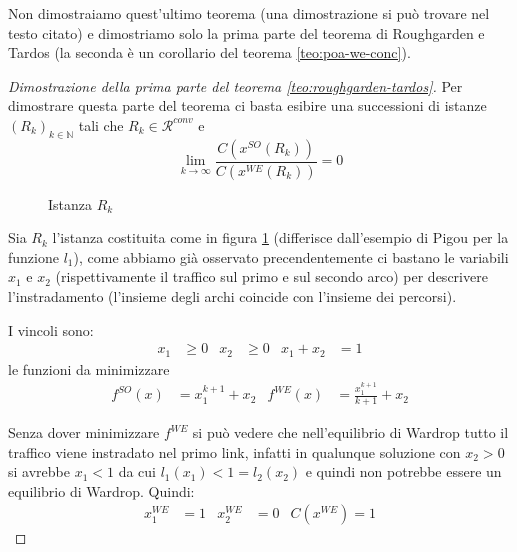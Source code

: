 \documentclass[a4paper]{article}
\theoremstyle{plain}
\theoremstyle{definition}
\theoremstyle{remark}
\newcommand{\pa}[1]{\left(#1\right)}
\begin{document}
Non dimostraiamo quest'ultimo teorema (una dimostrazione si può
trovare nel testo citato) e dimostriamo solo la prima
parte del teorema di Roughgarden e Tardos (la seconda è un corollario
del teorema \ref{teo:poa-we-conc}).

\begin{proof}[Dimostrazione della prima parte del teorema \ref{teo:roughgarden-tardos}]
  Per dimostrare questa parte del teorema ci basta esibire una
  successioni di istanze $\pa{R_k}_{k\in \mathbb{N}}$ tali che $R_k\in
  \mathcal{R}^{conv}$ e
  \[ \lim _{k\to \infty} \frac{C\pa{ x^{SO}\pa{R_k}}}{C\pa{
x^{WE}\pa{R_k}}} = 0 \]

  \begin{figure}[ht]
    \centering
    \caption{Istanza $R_k$}
    \label{fig:esempio-conv-poa}
  \end{figure}

  Sia $R_k$ l'istanza costituita come in figura
  \ref{fig:esempio-conv-poa} (differisce dall'esempio di Pigou per la
  funzione $l_1$), come abbiamo già osservato precendentemente ci
  bastano le variabili $x_1$ e $x_2$ (rispettivamente il traffico sul
  primo e sul secondo arco) per descrivere l'instradamento (l'insieme
  degli archi coincide con l'insieme dei percorsi).
  
  I vincoli sono:
  \begin{align*}
    x_1 &\ge 0 & x_2 &\ge 0 & x_1 + x_2 &= 1
  \end{align*}
  le funzioni da minimizzare
  \begin{align*}
    f^{SO}(x) &= x_1^{k+1} + x_2 & f^{WE}(x) &= \frac{x_1^{k+1}}{k+1}
                                              + x_2
  \end{align*}
  
  Senza dover minimizzare $f^{WE}$ si può vedere che nell'equilibrio
  di Wardrop tutto il traffico viene instradato nel primo link,
  infatti in qualunque soluzione con $x_2>0$ si avrebbe $x_1<1$ da cui
  $l_1(x_1) < 1 = l_2(x_2)$ e quindi non potrebbe essere un equilibrio
  di Wardrop. Quindi:
  \begin{align*}
    x^{WE}_1 &= 1 & x^{WE}_2 &= 0 & C\pa{x^{WE}} = 1
  \end{align*}


\end{proof}
\end{document}
